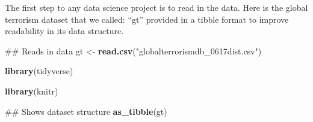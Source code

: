 \documentclass[11pt,letterpaper,]{article}
\newenvironment{Shaded}{\begin{snugshade}}{\end{snugshade}}
\newcommand{\KeywordTok}[1]{\textcolor[rgb]{0.13,0.29,0.53}{\textbf{{#1}}}}
\newcommand{\StringTok}[1]{\textcolor[rgb]{0.31,0.60,0.02}{{#1}}}
\newcommand{\NormalTok}[1]{{#1}}
\theoremstyle{definition}
\theoremstyle{definition}
\theoremstyle{definition}
\theoremstyle{remark}
\begin{document}
The first step to any data science project is to read in the data. Here
is the global terrorism dataset that we called: ``gt'' provided in a
tibble format to improve readability in its data structure.

\begin{Shaded}
\begin{Highlighting}[]
\NormalTok{## Reads in data}
\NormalTok{gt <-}\StringTok{ }\KeywordTok{read.csv}\NormalTok{(}\StringTok{"globalterrorismdb_0617dist.csv"}\NormalTok{)}

\KeywordTok{library}\NormalTok{(tidyverse)}

\KeywordTok{library}\NormalTok{(knitr)}

\NormalTok{## Shows dataset structure}
\KeywordTok{as_tibble}\NormalTok{(gt)}
\end{Highlighting}
\end{Shaded}
\end{document}

